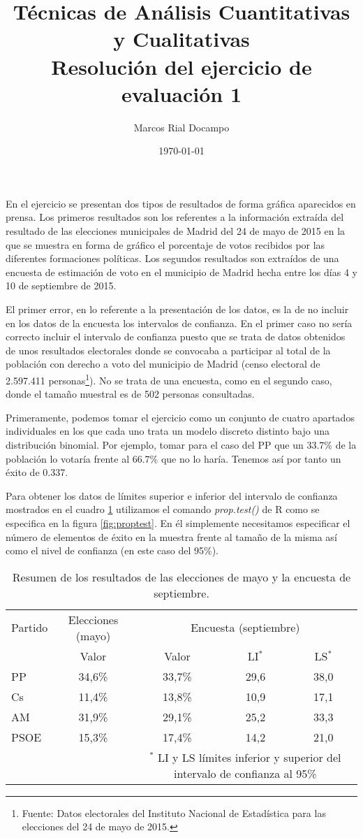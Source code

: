\documentclass[11pt,a4paper]{article}
\author{Marcos Rial Docampo}
\title{Técnicas de Análisis Cuantitativas y Cualitativas\\Resolución del ejercicio de evaluación 1}
\date{\small{\today}}
\begin{document}
\maketitle

En el ejercicio se presentan dos tipos de resultados de forma gráfica aparecidos en prensa. Los primeros resultados son los referentes a la información extraída del resultado de las elecciones municipales de Madrid del 24 de mayo de 2015 en la que se muestra en forma de gráfico el porcentaje de votos recibidos por las diferentes formaciones políticas. Los segundos resultados son extraídos de una encuesta de estimación de voto en el municipio de Madrid hecha entre los días 4 y 10 de septiembre de 2015.

El primer error, en lo referente a la presentación de los datos, es la de no incluir en los datos de la encuesta los intervalos de confianza. En el primer caso no sería correcto incluir el intervalo de confianza puesto que se trata de datos obtenidos de unos resultados electorales donde se convocaba a participar al total de la población con derecho a voto del municipio de Madrid (censo electoral de 2.597.411 personas\footnote{Fuente: Datos electorales del Instituto Nacional de Estadística para las elecciones del 24 de mayo de 2015.}). No se trata de una encuesta, como en el segundo caso, donde el tamaño muestral es de 502 personas consultadas.

Primeramente, podemos tomar el ejercicio como un conjunto de cuatro apartados individuales en los que cada uno trata un modelo discreto distinto bajo una distribución binomial. Por ejemplo, tomar para el caso del PP que un 33.7\% de la población lo votaría frente al 66.7\% que no lo haría. Tenemos así por tanto un éxito de 0.337.

Para obtener los datos de límites superior e inferior del intervalo de confianza mostrados en el cuadro \ref{tab:resumen} utilizamos el comando \textit{prop.test()} de R como se especifica en la figura \ref{fig:proptest}. En él simplemente necesitamos especificar el número de elementos de éxito en la muestra frente al tamaño de la misma así como el nivel de confianza (en este caso del 95\%).

\begin{table}
	\centering
	\begin{tabular}{lcccc}
	\toprule[0.4mm]
	Partido & Elecciones (mayo) & \multicolumn{3}{c}{Encuesta (septiembre)}\\
	& Valor & Valor & LI$^{*}$ & LS$^{*}$ \\
	\midrule
	PP & 34,6\% & 33,7\% & 29,6 & 38,0 \\
	Cs & 11,4\% & 13,8\% & 10,9 & 17,1 \\
	AM & 31,9\% & 29,1\% & 25,2 & 33,3 \\
	PSOE & 15,3\% & 17,4\% & 14,2 & 21,0 \\
	\bottomrule[0.4mm]
	& & \multicolumn{3}{p{3.4cm}}{\footnotesize{$^{*}$ LI y LS límites inferior y superior del intervalo de confianza al 95\%}}
	\end{tabular}
	\caption{Resumen de los resultados de las elecciones de mayo y la encuesta de septiembre.}
\label{tab:resumen}
\end{table}
\end{document}
